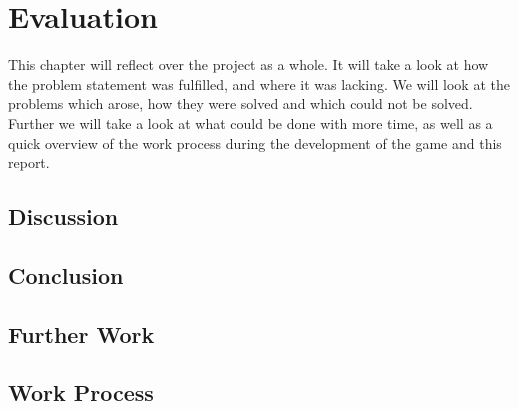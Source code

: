 \chapter{Evaluation}
This chapter will reflect over the project as a whole. It will take a look at how the problem statement was fulfilled, and where it was lacking. We will look at the problems which arose, how they were solved and which could not be solved. Further we will take a look at what could be done with more time, as well as a quick overview of the work process during the development of the game and this report.

\section{Discussion}
\section{Conclusion}
\section{Further Work}


\section{Work Process}

